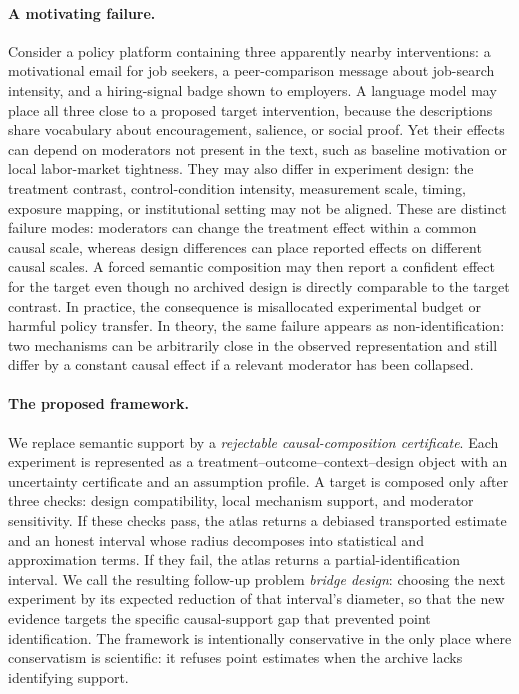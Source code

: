 \documentclass[11pt]{article}
\numberwithin{equation}{section}
\newcommand{\1}{\mathbf 1}
\begin{document}
\paragraph{A motivating failure.}
Consider a policy platform containing three apparently nearby interventions: a motivational email for job seekers, a peer-comparison message about job-search intensity, and a hiring-signal badge shown to employers.  A language model may place all three close to a proposed target intervention, because the descriptions share vocabulary about encouragement, salience, or social proof.  Yet their effects can depend on moderators not present in the text, such as baseline motivation or local labor-market tightness.  They may also differ in experiment design: the treatment contrast, control-condition intensity, measurement scale, timing, exposure mapping, or institutional setting may not be aligned.  These are distinct failure modes: moderators can change the treatment effect within a common causal scale, whereas design differences can place reported effects on different causal scales.  A forced semantic composition may then report a confident effect for the target even though no archived design is directly comparable to the target contrast.  In practice, the consequence is misallocated experimental budget or harmful policy transfer.  In theory, the same failure appears as non-identification: two mechanisms can be arbitrarily close in the observed representation and still differ by a constant causal effect if a relevant moderator has been collapsed.

\paragraph{The proposed framework.}
We replace semantic support by a \emph{rejectable causal-composition certificate}.  Each experiment is represented as a treatment--outcome--context--design object with an uncertainty certificate and an assumption profile.  A target is composed only after three checks: design compatibility, local mechanism support, and moderator sensitivity.  If these checks pass, the atlas returns a debiased transported estimate and an honest interval whose radius decomposes into statistical and approximation terms.  If they fail, the atlas returns a partial-identification interval.  We call the resulting follow-up problem \emph{bridge design}: choosing the next experiment by its expected reduction of that interval's diameter, so that the new evidence targets the specific causal-support gap that prevented point identification.  The framework is intentionally conservative in the only place where conservatism is scientific: it refuses point estimates when the archive lacks identifying support.
\end{document}
